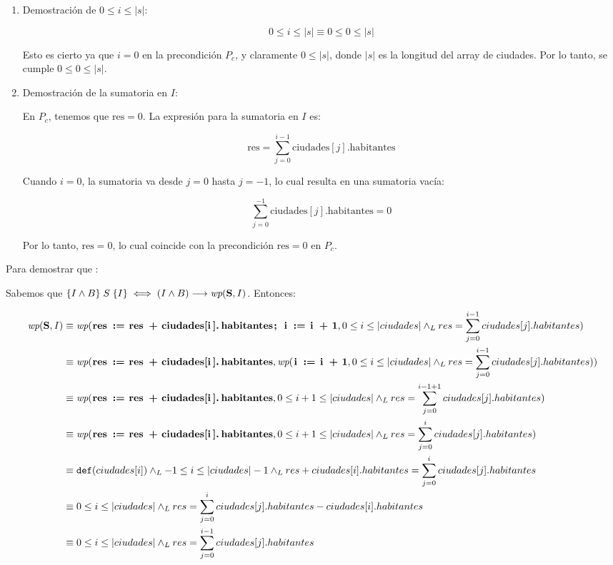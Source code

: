 \documentclass[10pt,a4paper]{article}
\begin{document}
\begin{enumerate}
	\item Demostración de \( 0 \leq i \leq |s| \):

	      \[
		      0 \leq i \leq |s| \equiv 0 \leq 0 \leq |s|
	      \]

	      Esto es cierto ya que \( i = 0 \) en la precondición \( P_c \), y claramente \( 0 \leq |s| \), donde \( |s| \) es la longitud del array de ciudades. Por lo tanto, se cumple \( 0 \leq 0 \leq |s| \).

	\item Demostración de la sumatoria en \( I \):

	      En \( P_c \), tenemos que \( \text{res} = 0 \). La expresión para la sumatoria en \( I \) es:

	      \[
		      \text{res} = \sum_{j=0}^{i-1} \text{ciudades}[j].\text{habitantes}
	      \]

	      Cuando \( i = 0 \), la sumatoria va desde \( j = 0 \) hasta \( j = -1 \), lo cual resulta en una sumatoria vacía:

	      \[
		      \sum_{j=0}^{-1} \text{ciudades}[j].\text{habitantes} = 0
	      \]

	      Por lo tanto, \( \text{res} = 0 \), lo cual coincide con la precondición \( \text{res} = 0 \) en \( P_c \).
\end{enumerate}

Para demostrar que :

Sabemos que $\hoare{I \land B}{S}{I} \iff (I \land B) \implica \wp{S}{I}$. Entonces:

\begin{align*}
	\wp{S}{I} & \equiv  \wp{ res := res + ciudades[i].habitantes; i := i + 1}{0 \leq i \leq |ciudades| \yLuego res = \sum_{j=0}^{i-1} ciudades[j].habitantes}      \\
	          & \equiv  \wp{ res := res + ciudades[i].habitantes}{\wp{i := i + 1}{0 \leq i \leq |ciudades| \yLuego res = \sum_{j=0}^{i-1} ciudades[j].habitantes}} \\
	          & \equiv  \wp{ res := res + ciudades[i].habitantes}{0 \leq i+1 \leq |ciudades| \yLuego res = \sum_{j=0}^{i-1 + 1} ciudades[j].habitantes}            \\
	          & \equiv  \wp{ res := res + ciudades[i].habitantes}{0 \leq i+1 \leq |ciudades| \yLuego res = \sum_{j=0}^{i} ciudades[j].habitantes}                  \\
	          & \equiv  \Def{ciudades[i]} \yLuego -1 \leq i \leq |ciudades| -1 \yLuego res + ciudades[i].habitantes = \sum_{j=0}^{i} ciudades[j].habitantes        \\
	          & \equiv  0 \leq i \leq |ciudades| \yLuego res = \sum_{j=0}^{i} ciudades[j].habitantes - ciudades[i].habitantes                                      \\
	          & \equiv  0 \leq i \leq |ciudades|  \yLuego res = \sum_{j=0}^{i-1} ciudades[j].habitantes
\end{align*}
\end{document}
